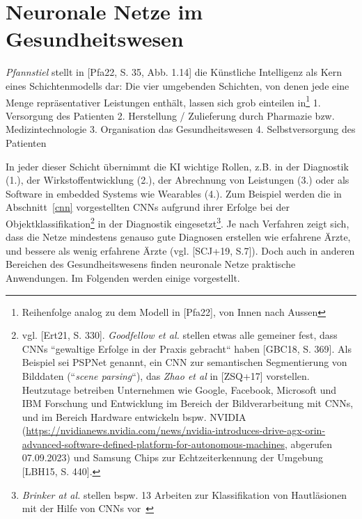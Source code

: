 \chapter{Neuronale Netze im Gesundheitswesen}



\textit{Pfannstiel} stellt in [Pfa22, S. 35, Abb. 1.14] die Künstliche Intelligenz als Kern eines Schichtenmodells dar: Die vier umgebenden Schichten, von denen jede eine Menge repräsentativer Leistungen enthält, lassen sich grob einteilen in\footnote{
    Reihenfolge analog zu dem Modell in [Pfa22], von Innen nach Aussen
}
1. Versorgung des Patienten
2. Herstellung / Zulieferung durch Pharmazie bzw. Medizintechnologie
3. Organisation das Gesundheitswesen
4. Selbstversorgung des Patienten

In jeder dieser Schicht übernimmt die KI wichtige Rollen, z.B. in der Diagnostik (1.), der Wirkstoffentwicklung (2.), der Abrechnung von Leistungen (3.) oder als Software in embedded Systems wie Wearables (4.). Zum Beispiel werden die in Abschnitt~\ref{cnn} vorgestellten CNNs aufgrund ihrer Erfolge bei der Objektklassifikation\footnote{
    vgl. [Ert21, S. 330]. \textit{Goodfellow et al.} stellen etwas alle gemeiner fest, dass CNNs ``gewaltige Erfolge in der Praxis gebracht`` haben [GBC18, S. 369]. Als Beispiel sei PSPNet genannt, ein CNN zur semantischen Segmentierung von Bilddaten (``\textit{scene parsing}``), das \textit{Zhao et al} in [ZSQ+17] vorstellen. Heutzutage betreiben Unternehmen wie Google, Facebook, Microsoft und IBM Forschung und Entwicklung im Bereich der Bildverarbeitung mit CNNs, und im Bereich Hardware entwickeln bspw. NVIDIA (\url{https://nvidianews.nvidia.com/news/nvidia-introduces-drive-agx-orin-advanced-software-defined-platform-for-autonomous-machines}, abgerufen 07.09.2023) und Samsung Chips zur Echtzeiterkennung der Umgebung  [LBH15, S. 440].
} in der Diagnostik eingesetzt\footnote{
    \textit{Brinker at al.} stellen bspw. 13 Arbeiten zur Klassifikation von Hautläsionen mit der Hilfe von CNNs vor~\cite{BHU+18}
}. Je nach Verfahren zeigt sich, dass die Netze mindestens genauso gute Diagnosen erstellen wie erfahrene Ärzte, und bessere als wenig erfahrene Ärzte (vgl. [SCJ+19, S.7]). Doch auch in anderen Bereichen des Gesundheitswesens finden neuronale Netze praktische Anwendungen. Im Folgenden werden einige vorgestellt.



